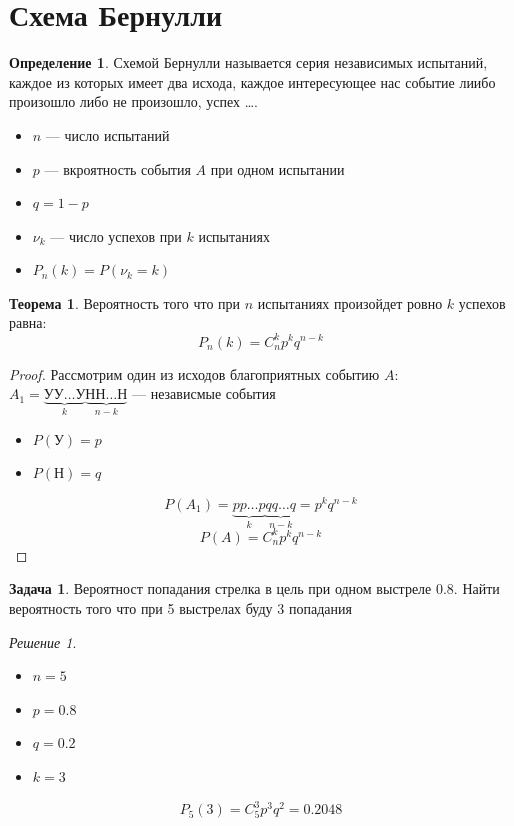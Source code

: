 \documentclass[oneside]{book}
\theoremstyle{plain}
\theoremstyle{remark}
\newtheorem*{solution}{Решение}
\theoremstyle{definition}
\newtheorem{task}{Задача}
\newtheorem{theorem}{Теорема}[section]
\newtheorem*{definition}{Определение}
\begin{document}
\section{Схема Бернулли}
\label{sec:org3d47ef0}
\begin{definition}
Схемой Бернулли называется серия независимых испытаний, каждое из
которых имеет два исхода, каждое интересующее нас событие лиибо
произошло либо не произошло, успех \ldots{}.
\begin{itemize}
\item \(n\) --- число испытаний
\item \(p\) --- вкроятность события \(A\) при одном испытании
\item \(q = 1 - p\)
\item \(\nu_k\) --- число успехов при \(k\) испытаниях
\item \(P_n(k) = P(\nu_k = k)\)
\end{itemize}
\end{definition}
\begin{theorem}
Вероятность того что при \(n\) испытаниях произойдет ровно \(k\) успехов равна:
\[ P_n(k) = C^k_np^kq^{n - k} \]
\end{theorem}
\begin{proof}
Рассмотрим один из исходов благоприятных событию \(A\): \(A_1 = \underbrace{\text{УУ}\dots\text{У}}_k\underbrace{\text{НН}\dots\text{Н}}_{n - k}\) --- независмые события \\
\begin{itemize}
\item \(P(\text{У}) = p\)
\item \(P(\text{Н}) = q\)
\end{itemize}
\[ P(A_1) = \underbrace{pp\dots p}_k\underbrace{qq\dots q}_{n - k} = p^kq^{n - k} \]
\[ P(A) = C^k_np^kq^{n - k} \]
\end{proof}
\begin{task}
Вероятност попадания стрелка в цель при одном выстреле 0.8. Найти
вероятность того что при 5 выстрелах буду 3 попадания
\end{task}
\begin{solution}
\-
\begin{itemize}
\item \(n = 5\)
\item \(p = 0.8\)
\item \(q = 0.2\)
\item \(k = 3\)
\end{itemize}
\[ P_5(3) = C^3_5 p^3q^2 = 0.2048\]
\end{solution}
\end{document}
